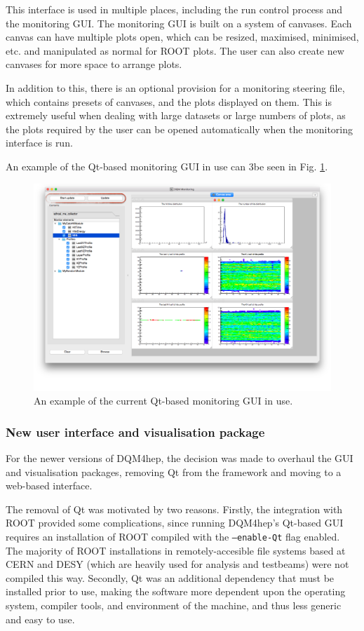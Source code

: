 This interface is used in multiple places, including the run control process and the monitoring GUI. The monitoring GUI is built on a system of canvases. Each canvas can have multiple plots open, which can be resized, maximised, minimised, etc. and manipulated as normal for ROOT plots. The user can also create new canvases for more space to arrange plots.

In addition to this, there is an optional provision for a monitoring steering file, which contains presets of canvases, and the plots displayed on them. This is extremely useful when dealing with large datasets or large numbers of plots, as the plots required by the user can be opened automatically when the monitoring interface is run.

An example of the Qt-based monitoring GUI in use can 3be seen in Fig. \ref{figure:daq/dqm4hep/old-gui}. 

\begin{figure}[h]
	\centering
	\includegraphics[width=1.0\textwidth]{../Pictures/DQM4hepMonitoringGui.png}
	\caption{An example of the current Qt-based monitoring GUI in use.}
	\label{figure:daq/dqm4hep/old-gui}
\end{figure}

\subsubsection{New user interface and visualisation package}
For the newer versions of DQM4hep, the decision was made to overhaul the GUI and visualisation packages, removing Qt from the framework and moving to a web-based interface.

The removal of Qt was motivated by two reasons. Firstly, the integration with ROOT provided some complications, since running DQM4hep's Qt-based GUI requires an installation of ROOT compiled with the \texttt{--enable-Qt} flag enabled. The majority of ROOT installations in remotely-accesible file systems based at CERN and DESY (which are heavily used for analysis and testbeams) were not compiled this way. Secondly, Qt was an additional dependency that must be installed prior to use, making the software more dependent upon the operating system, compiler tools, and environment of the machine, and thus less generic and easy to use. %

